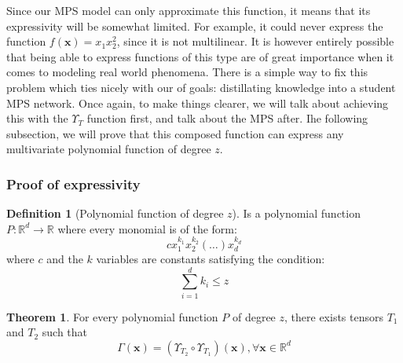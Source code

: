 \documentclass{article}
\theoremstyle{definition}
\newtheorem{definition}{Definition}[section]
\newtheorem{theorem}{Theorem}[section]
\theoremstyle{definition}
\begin{document}
Since our MPS model can only approximate this function, it means that its expressivity
will be somewhat limited. For example, it could never express the function $f(\mathbf{x}) = x_1x_2^2$, since it is not multilinear. It is however entirely possible that being able to express functions of this type are of great importance when it comes to modeling real world phenomena. There is a simple way to fix this problem which ties nicely with our of goals: distillating knowledge into a student MPS network. Once again, to make things clearer, we will talk about achieving this with the $\Upsilon_{T}$ function first, and talk about the MPS after. Ihe following subsection, we will prove that this composed function can express
any multivariate polynomial function of degree $z$.

\subsubsection{Proof of expressivity}
\begin{definition}[Polynomial function of degree $z$]

    Is a polynomial function $P: \mathbb{R}^d \to \mathbb{R}$ where every monomial is of the form:
    \[
        cx_1^{k_1} x_2^{k_2}(\dots)x_d^{k_d}
    \]
    where $c$ and the $k$ variables are constants satisfying the condition:
    \[
        \sum_{i=1}^{d}k_i \leq z
    \]
\end{definition}


\begin{theorem}
    For every polynomial function $P$ of degree $z$, there exists tensors $T_1$ and $T_2$ such that
    \[ \Gamma(\mathbf{x}) = \left(\Upsilon_{T_2} \circ \Upsilon_{T_1}\right) (\mathbf{x}), \forall \mathbf{x} \in \mathbb{R}^d\]
\end{theorem}
\end{document}
